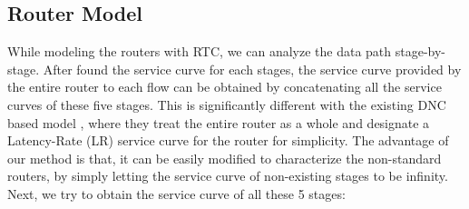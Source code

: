\documentclass[10pt,journal]{IEEEtran}
\begin{document}
\subsection{Router Model}\label{router}
While modeling the routers with RTC, we can analyze the data path stage-by-stage. After found the service curve for each stages, the service curve provided by the entire router to each flow can be obtained by concatenating all the service curves of these five stages. This is significantly different with the existing DNC based model \cite{qian2009analysis,Qian489900}, where they treat the entire router as a whole and designate a Latency-Rate (LR) service curve for the router for simplicity. The advantage of our method is that, it can be easily modified to characterize the non-standard routers, by simply letting the service curve of non-existing stages to be infinity. Next, we try to obtain the service curve of all these 5 stages:
\end{document}
